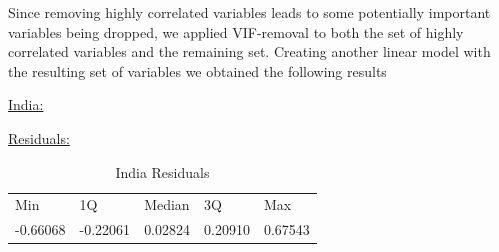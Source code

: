 \documentclass[11pt]{article}
\begin{document}
Since removing highly correlated variables leads to some potentially important variables being dropped, we applied VIF-removal to both the set of highly correlated variables and the remaining set.
Creating another linear model with the resulting set of variables we obtained the following results

\begin{center}\underline{India:} \end{center}
\underline{Residuals:}
\FloatBarrier
\begin{table}[!htbp]
\centering
\begin{tabular}{lllll}
Min      & 1Q       & Median  & 3Q      & Max     \\
-0.66068 & -0.22061 & 0.02824 & 0.20910 & 0.67543
\end{tabular}
\caption{India Residuals}
\label{table13}
\end{table}
\FloatBarrier
\end{document}
